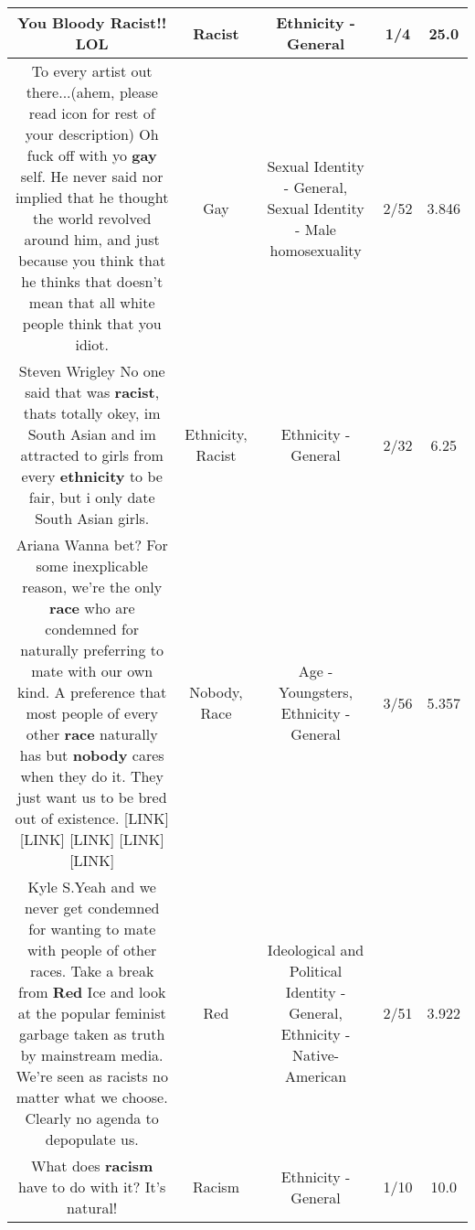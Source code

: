 \documentclass[11pt]{article}
\newlength\mylength
\begin{document}
\begin{center}
\begin{longtable}{|C{.65\mylength}|C{.30\mylength}|C{.12\mylength}|C{.12\mylength}|C{.12\mylength}|}
  \small You Bloody \textbf{Racist}!! LOL\normalsize   & Racist & Ethnicity - General & 1/4 & 25.0 \\  \hline
  \small To every artist out there...(ahem, please read icon for rest of your description) Oh fuck off with yo \textbf{g\textbf{ay}} self. He never said nor implied that he thought the world revolved around him, and just because you think that he thinks that doesn't mean that all white people think that you idiot.\normalsize   & Gay & Sexual Identity - General, Sexual Identity - Male homosexuality & 2/52 & 3.846 \\  \hline
  \small Steven Wrigley No one said that was \textbf{racist}, thats totally okey, im South Asian and im attracted to girls from every \textbf{ethnicity} to be fair, but i only date South Asian girls.\normalsize   & Ethnicity, Racist & Ethnicity - General & 2/32 & 6.25 \\  \hline
  \small Ariana Wanna bet? For some inexplicable reason, we're the only \textbf{race} who are condemned for naturally preferring to mate with our own kind. A preference that most people of every other \textbf{race} naturally has but \textbf{nobody} cares when they do it. They just want us to be bred out of existence. [LINK]  [LINK]  [LINK]  [LINK]  [LINK] \normalsize   & Nobody, Race & Age - Youngsters, Ethnicity - General & 3/56 & 5.357 \\  \hline
  \small Kyle S.Yeah and we never get condemned for wanting to mate with people of other races. Take a break from \textbf{R\textbf{ed}} Ice and look at the popular feminist garbage taken as truth by mainstream media. We're seen as racists no matter what we choose. Clearly no agenda to depopulate us.\normalsize   & Red &  Ideological and Political Identity - General, Ethnicity - Native-American & 2/51 & 3.922 \\  \hline
  \small What does \textbf{racism} have to do with it? It's natural!\normalsize   & Racism & Ethnicity - General & 1/10 & 10.0 \\  \hline

\end{longtable}
\end{center}
\end{document}
